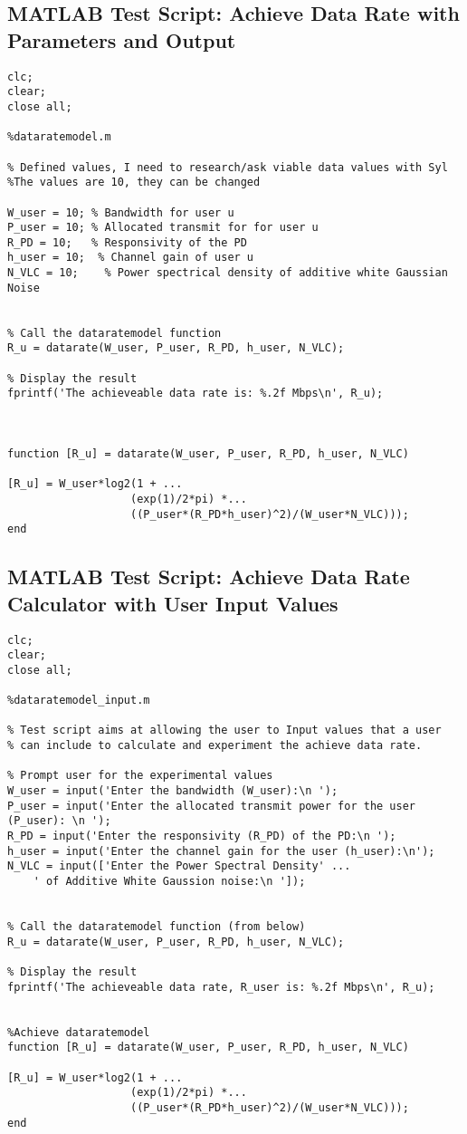 \newpage
\subsection{MATLAB Test Script: Achieve Data Rate with Parameters and Output}


\begin{lstlisting}
clc; 
clear; 
close all;

%dataratemodel.m

% Defined values, I need to research/ask viable data values with Syl
%The values are 10, they can be changed

W_user = 10; % Bandwidth for user u
P_user = 10; % Allocated transmit for for user u
R_PD = 10;   % Responsivity of the PD
h_user = 10;  % Channel gain of user u
N_VLC = 10;    % Power spectrical density of additive white Gaussian Noise 


% Call the dataratemodel function
R_u = datarate(W_user, P_user, R_PD, h_user, N_VLC);

% Display the result
fprintf('The achieveable data rate is: %.2f Mbps\n', R_u);



function [R_u] = datarate(W_user, P_user, R_PD, h_user, N_VLC)

[R_u] = W_user*log2(1 + ...
                   (exp(1)/2*pi) *...
                   ((P_user*(R_PD*h_user)^2)/(W_user*N_VLC)));
end
\end{lstlisting}

\subsection{MATLAB Test Script: Achieve Data Rate Calculator with User Input Values}

\begin{lstlisting}
clc; 
clear; 
close all;

%dataratemodel_input.m

% Test script aims at allowing the user to Input values that a user 
% can include to calculate and experiment the achieve data rate.

% Prompt user for the experimental values
W_user = input('Enter the bandwidth (W_user):\n ');
P_user = input('Enter the allocated transmit power for the user (P_user): \n ');
R_PD = input('Enter the responsivity (R_PD) of the PD:\n ');
h_user = input('Enter the channel gain for the user (h_user):\n');
N_VLC = input(['Enter the Power Spectral Density' ...
    ' of Additive White Gaussion noise:\n ']);


% Call the dataratemodel function (from below)
R_u = datarate(W_user, P_user, R_PD, h_user, N_VLC);

% Display the result
fprintf('The achieveable data rate, R_user is: %.2f Mbps\n', R_u);


%Achieve dataratemodel
function [R_u] = datarate(W_user, P_user, R_PD, h_user, N_VLC)

[R_u] = W_user*log2(1 + ...
                   (exp(1)/2*pi) *...
                   ((P_user*(R_PD*h_user)^2)/(W_user*N_VLC)));
end


\end{lstlisting}

